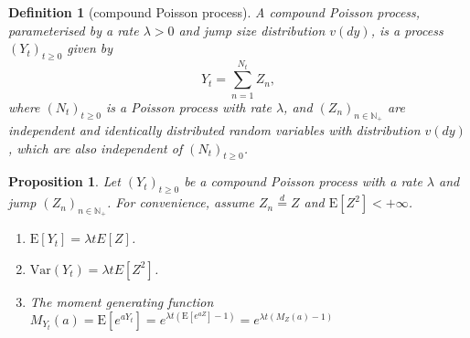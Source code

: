 \documentclass{article}
\newtheorem{definition}{Definition}[section]
\newtheorem{proposition}{Proposition}[section]
\theoremstyle{nonumberplain}
\begin{document}
\begin{definition}[compound Poisson process]
	\emph{A compound Poisson process}, parameterised by a rate $\lambda >0$ and jump size distribution $v(dy)$, is a process $(Y_t)_{t\ge 0}$ given by
	\[
	Y_t=\sum _{n=1}^{N_t}Z_{n},
	\]
	where $(N_t)_{t\ge 0}$ is a Poisson process with rate $\lambda$, and $(Z_n)_{n\in \mathbb{N}_+}$ are independent and identically distributed random variables with distribution $v(dy)$, which are also independent of $(N_t)_{t\ge 0}$.
\end{definition}

\begin{proposition}
	Let $(Y_t)_{t\ge 0}$ be a compound Poisson process with a rate $\lambda$ and jump $(Z_n)_{n\in \mathbb{N}_+}$. For convenience, assume $Z_n\overset{d}{=}Z$ and $\mathrm{E}[Z^2]<+\infty$.
	\begin{enumerate}
		\item $\mathrm{E}[Y_t]=\lambda tE[Z]$.
		\item $\mathrm{Var}(Y_t)=\lambda tE[Z^2]$.
		\item The moment generating function $M_{Y_t}(a)=\mathrm{E}[e^{aY_t}]=e^{\lambda t(\mathrm{E}[e^{aZ}]-1)}=e^{\lambda t(M_Z(a)-1)}$
	\end{enumerate}
\end{proposition}
\end{document}
